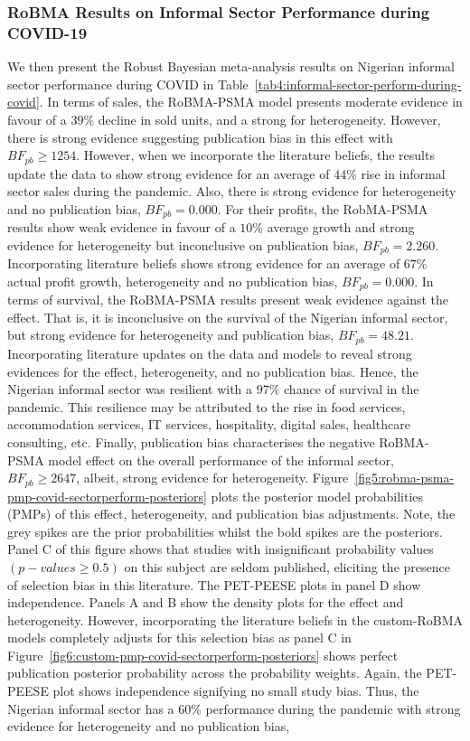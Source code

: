 \documentclass[a4paper, 12pt]{article}
\begin{document}
    \subsubsection{RoBMA Results on Informal Sector Performance during COVID-19}\label{subsubsec:robma-results-on-informal-sector-performance-during-covid-19}
    We then present the Robust Bayesian meta-analysis results on Nigerian informal sector performance during COVID in Table~\ref{tab4:informal-sector-perform-during-covid}. In terms of sales, the RoBMA-PSMA model presents moderate evidence in favour of a $39\%$ decline in sold units, and a strong for heterogeneity. However, there is strong evidence suggesting publication bias in this effect with $BF_{pb} \geq 1254$. However, when we incorporate the literature beliefs, the results update the data to show strong evidence for an average of $44\%$ rise in informal sector sales during the pandemic. Also, there is strong evidence for heterogeneity and no publication bias, $BF_{pb} = 0.000$. For their profits, the RobMA-PSMA results show weak evidence in favour of a $10\%$ average growth and strong evidence for heterogeneity but inconclusive on publication bias, $BF_{pb} = 2.260$. Incorporating literature beliefs shows strong evidence for an average of $67\%$ actual profit growth, heterogeneity and no publication bias, $BF_{pb} = 0.000$. In terms of survival, the RoBMA-PSMA results present weak evidence against the effect. That is, it is inconclusive on the survival of the Nigerian informal sector, but strong evidence for heterogeneity and publication bias, $BF_{pb} = 48.21$. Incorporating literature updates on the data and models to reveal strong evidences for the effect, heterogeneity, and no publication bias. Hence, the Nigerian informal sector was resilient with a $97\%$ chance of survival in the pandemic. This resilience may be attributed to the rise in food services, accommodation services, IT services, hospitality, digital sales, healthcare consulting, etc. Finally, publication bias characterises the negative RoBMA-PSMA model effect on the overall performance of the informal sector, $BF_{pb} \geq 2647$, albeit, strong evidence for heterogeneity. Figure~\ref{fig5:robma-psma-pmp-covid-sectorperform-posteriors} plots the posterior model probabilities (PMPs) of this effect, heterogeneity, and publication bias adjustments. Note, the grey spikes are the prior probabilities whilst the bold spikes are the posteriors. Panel C of this figure shows that studies with insignificant probability values $(p-values \geq 0.5)$ on this subject are seldom published, eliciting the presence of selection bias in this literature. The PET-PEESE plots in panel D show independence. Panels A and B show the density plots for the effect and heterogeneity. However, incorporating the literature beliefs in the custom-RoBMA models completely adjusts for this selection bias as panel C in Figure~\ref{fig6:custom-pmp-covid-sectorperform-posteriors} shows perfect publication posterior probability across the probability weights. Again, the PET-PEESE plot shows independence signifying no small study bias. Thus, the Nigerian informal sector has a $60\%$ performance during the pandemic with strong evidence for heterogeneity and no publication bias, 
\end{document}
